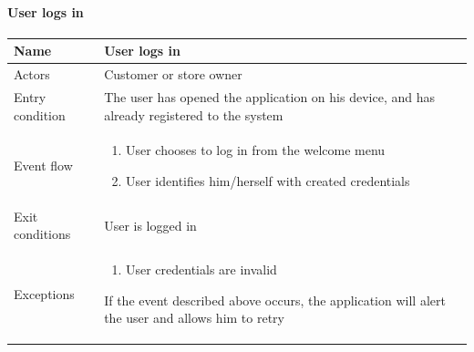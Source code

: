\paragraph{User logs in}
\begin{flushleft}
	\begin{tabular} { | m{3cm} | m{10cm} | }
		\hline
		Name & User logs in\\
		\hline
		Actors & Customer or store owner\\
		\hline
		Entry condition & The user has opened the application on his device, and has already registered to the system\\
		\hline
		Event flow & \begin{enumerate}
            \item User chooses to log in from the welcome menu
            \item User identifies him/herself with created credentials
		\end{enumerate}\\
		\hline
		Exit conditions & User is logged in\\
		\hline
		Exceptions & \begin{enumerate}
			\item User credentials are invalid
		\end{enumerate}
		If the event described above occurs, the application will alert the user and allows him to retry\\
		\hline
	\end{tabular}
\end{flushleft}
\newpage
